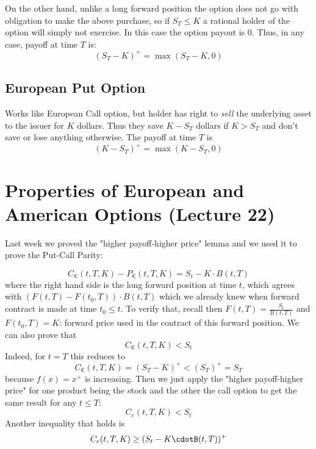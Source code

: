 \documentclass[oneside]{book}
\begin{document}
On the other hand, unlike a long forward position the option does not go with
obligation to make the above purchase, so if $S_T \leq K$ a rational holder
of the option will simply not exercise. In this case the option payout is $0$.
Thus, in any case, payoff at time $T$ is:
$$
(S_T-K)^+ = \max(S_T-K, 0)
$$
\subsection{European Put Option}
Works like European Call option, but holder has right to \textit{sell} the underlying
asset to the issuer for $K$ dollars. Thus they save $K-S_T$ dollars if $K>S_T$ and don't
save or lose anything otherwise. The payoff at time $T$ is
$$
(K-S_T)^+ = \max(K-S_T, 0)
$$

\section{Properties of European and American Options (Lecture 22)}
Last week we proved the "higher payoff-higher price" lemma and we used it to prove
 the Put-Call Parity:

 $$
 C_\euro(t, T, K) - P_\euro(t, T, K)  = S_t - K \cdot B(t,T)
 $$
 where the right hand side is the long forward position at time $t$, which agrees with
 $(F(t,T) -F(t_0, T)) \cdot B(t,T)$ which we already knew when forward contract is made
 at time $t_0 \leq t$. To verify that, recall then $F(t,T) = \frac{S_t}{B(t,T)}$ and
 $F(t_0, T) = K$: forward price used in the contract of this forward position.
 We can also prove that
 $$
    C_\euro(t,T,K) < S_t
 $$
 Indeed, for $t=T$ this reduces to
 $$
    C_\euro(t,T,K) = (S_T - K)^+ < (S_T)^+ = S_T
 $$
 because $f(x) = x^+$ is increasing.
 Then we just apply the "higher payoff-higher price" for one product being the
 stock and the other the call option to get the same result for any $t \leq T$:
 $$
 C_e(t,T,K) < S_t
 $$
 Another inequality that holds is
 $$
 C_e(t,T,K) \geq (S_t - K\cdotB(t,T))^+
 $$
\end{document}

